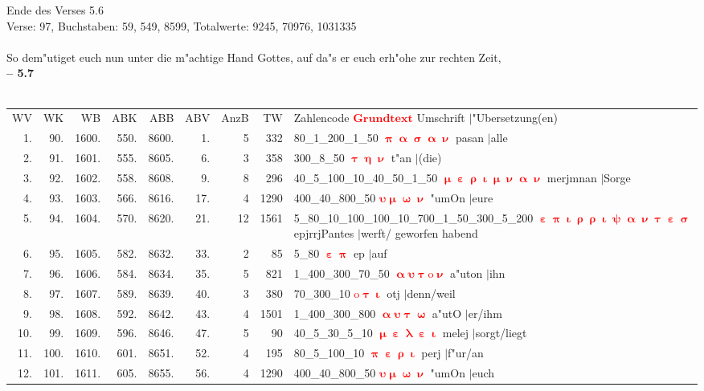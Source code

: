\documentclass[a4paper,10pt,landscape]{article}
\begin{document}
Ende des Verses 5.6\\
Verse: 97, Buchstaben: 59, 549, 8599, Totalwerte: 9245, 70976, 1031335\\
\\
So dem"utiget euch nun unter die m"achtige Hand Gottes, auf da"s er euch erh"ohe zur rechten Zeit,\\
\newpage 
{\bf -- 5.7}\\
\medskip \\
\begin{tabular}{rrrrrrrrp{120mm}}
WV&WK&WB&ABK&ABB&ABV&AnzB&TW&Zahlencode \textcolor{red}{$\boldsymbol{Grundtext}$} Umschrift $|$"Ubersetzung(en)\\
1.&90.&1600.&550.&8600.&1.&5&332&80\_1\_200\_1\_50 \textcolor{red}{$\boldsymbol{\uppi\upalpha\upsigma\upalpha\upnu}$} pasan $|$alle\\
2.&91.&1601.&555.&8605.&6.&3&358&300\_8\_50 \textcolor{red}{$\boldsymbol{\uptau\upeta\upnu}$} t"an $|$(die)\\
3.&92.&1602.&558.&8608.&9.&8&296&40\_5\_100\_10\_40\_50\_1\_50 \textcolor{red}{$\boldsymbol{\upmu\upepsilon\uprho\upiota\upmu\upnu\upalpha\upnu}$} merjmnan $|$Sorge\\
4.&93.&1603.&566.&8616.&17.&4&1290&400\_40\_800\_50 \textcolor{red}{$\boldsymbol{\upsilon\upmu\upomega\upnu}$} "umOn $|$eure\\
5.&94.&1604.&570.&8620.&21.&12&1561&5\_80\_10\_100\_100\_10\_700\_1\_50\_300\_5\_200 \textcolor{red}{$\boldsymbol{\upepsilon\uppi\upiota\uprho\uprho\upiota\uppsi\upalpha\upnu\uptau\upepsilon\upsigma}$} epjrrjPantes $|$werft/ geworfen habend\\
6.&95.&1605.&582.&8632.&33.&2&85&5\_80 \textcolor{red}{$\boldsymbol{\upepsilon\uppi}$} ep $|$auf\\
7.&96.&1606.&584.&8634.&35.&5&821&1\_400\_300\_70\_50 \textcolor{red}{$\boldsymbol{\upalpha\upsilon\uptau\mathrm{o}\upnu}$} a"uton $|$ihn\\
8.&97.&1607.&589.&8639.&40.&3&380&70\_300\_10 \textcolor{red}{$\boldsymbol{\mathrm{o}\uptau\upiota}$} otj $|$denn/weil\\
9.&98.&1608.&592.&8642.&43.&4&1501&1\_400\_300\_800 \textcolor{red}{$\boldsymbol{\upalpha\upsilon\uptau\upomega}$} a"utO $|$er/ihm\\
10.&99.&1609.&596.&8646.&47.&5&90&40\_5\_30\_5\_10 \textcolor{red}{$\boldsymbol{\upmu\upepsilon\uplambda\upepsilon\upiota}$} melej $|$sorgt/liegt\\
11.&100.&1610.&601.&8651.&52.&4&195&80\_5\_100\_10 \textcolor{red}{$\boldsymbol{\uppi\upepsilon\uprho\upiota}$} perj $|$f"ur/an\\
12.&101.&1611.&605.&8655.&56.&4&1290&400\_40\_800\_50 \textcolor{red}{$\boldsymbol{\upsilon\upmu\upomega\upnu}$} "umOn $|$euch\\
\end{tabular}\medskip \\
\end{document}
